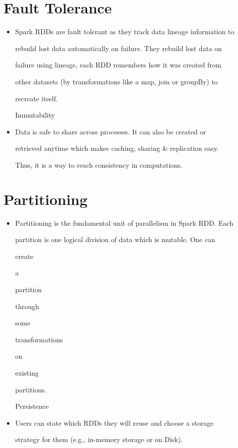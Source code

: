 \documentclass[12pt, openany]{book}
\begin{document}
\section{Fault Tolerance}
\begin{itemize}[leftmargin=*]\item Spark RDDs are fault tolerant as they track data lineage information to

rebuild lost data automatically on failure. They rebuild lost data on


failure using lineage, each RDD remembers how it was created from


other datasets (by transformations like a map, join or groupBy) to


recreate itself.


Immutability

\item Data is safe to share across processes. It can also be created or

retrieved anytime which makes caching, sharing \& replication easy.


Thus, it is a way to reach consistency in computations.
\end{itemize}

\section{Partitioning}
\begin{itemize}[leftmargin=*]\item Partitioning is the fundamental unit of parallelism in Spark RDD. Each

partition is one logical division of data which is mutable. One can


create


a


partition


through


some


transformations


on


existing


partitions.


Persistence

\item Users can state which RDDs they will reuse and choose a storage

strategy for them (e.g., in-memory storage or on Disk).
\end{itemize}
\end{document}
